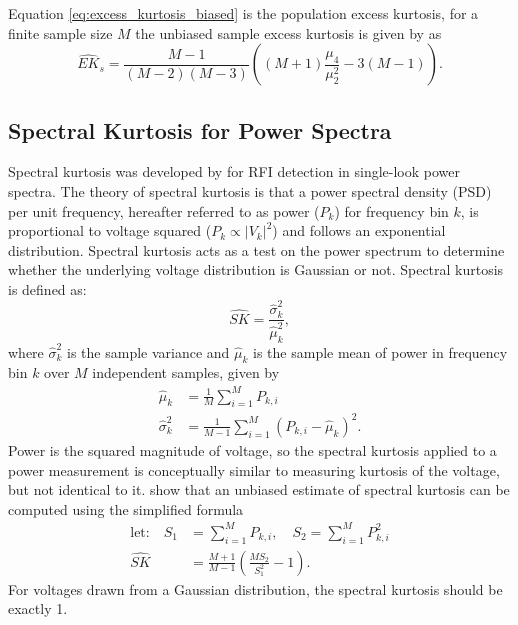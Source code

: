 Equation \ref{eq:excess_kurtosis_biased} is the population excess kurtosis, for a finite sample size $M$ the unbiased sample excess kurtosis is given by \citet{kendallAdvancedTheoryStatistics1969a} as
\begin{equation}
    \widehat{EK}_s = \frac{M-1}{(M-2)(M-3)} \left( (M+1) \frac{\mu_4}{\mu_2^2} - 3(M-1) \right).
    \label{eq:excess_kurtosis_unbiased}
\end{equation}

\subsection{Spectral Kurtosis for Power Spectra}

Spectral kurtosis was developed by \citet{nitaStatisticsSpectralKurtosis2010} for RFI detection in single-look power spectra. The theory of spectral kurtosis is that a power spectral density (PSD) per unit frequency, hereafter referred to as power ($P_k$) for frequency bin $k$, is proportional to voltage squared ($P_k \propto |V_k|^2$) and follows an exponential distribution. Spectral kurtosis acts as a test on the power spectrum to determine whether the underlying voltage distribution is Gaussian or not. Spectral kurtosis is defined as:
\begin{equation}
    \widehat{SK} = \frac{\widehat{\sigma}_k^2}{\widehat{\mu}_k^2},
\end{equation}
where $\hat{\sigma}_k^2$ is the sample variance and $\hat{\mu}_k$ is the sample mean of power in frequency bin $k$ over $M$ independent samples, given by 
\begin{align}
    \hat{\mu}_k &= \frac{1}{M} \sum_{i=1}^{M} P_{k,i} \\[4pt]
    \hat{\sigma}_k^2 &= \frac{1}{M-1} \sum_{i=1}^{M} (P_{k,i} - \hat{\mu}_k)^2.
\end{align}
Power is the squared magnitude of voltage, so the spectral kurtosis applied to a power measurement is conceptually similar to measuring kurtosis of the voltage, but not identical to it. \citet{nitaStatisticsSpectralKurtosis2010} show that an unbiased estimate of spectral kurtosis can be computed using the simplified formula
\begin{align}
    \text{let:} \quad S_1 &= \sum_{i=1}^{M} P_{k,i}, \quad S_2 = \sum_{i=1}^{M} P_{k,i}^2 \\[4pt]
    \widehat{SK} &= \frac{M+1}{M-1} \left( \frac{M S_2}{S_1^2} - 1 \right).
\end{align}
For voltages drawn from a Gaussian distribution, the spectral kurtosis should be exactly 1.\\

